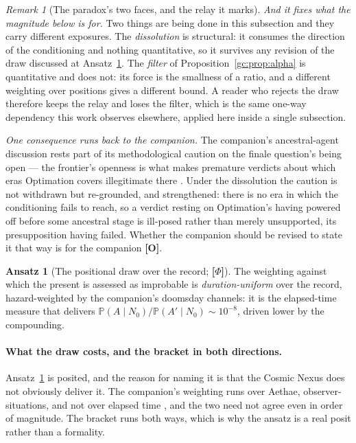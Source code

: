 \documentclass[11pt]{article}
\numberwithin{equation}{section}
\theoremstyle{plain}
\theoremstyle{definition}
\newtheorem{ansatz}[theorem]{Ansatz}
\theoremstyle{remark}
\newtheorem{remark}[theorem]{Remark}
\newcommand{\PP}{\mathbb{P}}
\begin{document}
\begin{remark}[The paradox's two faces, and the relay it marks]
\emph{And it fixes what the magnitude below is for.} Two things are
being done in this subsection and they carry different exposures. The
\emph{dissolution} is structural: it consumes the direction of the
conditioning and nothing quantitative, so it survives any revision of
the draw discussed at Ansatz~\ref{ra:ans:draw}. The \emph{filter} of
Proposition~\ref{gc:prop:alpha} is quantitative and does not: its force
is the smallness of a ratio, and a different weighting over positions
gives a different bound. A reader who rejects the draw therefore keeps
the relay and loses the filter, which is the same one-way dependency
this work observes elsewhere, applied here inside a single subsection.

\emph{One consequence runs back to the companion.} The companion's
ancestral-agent discussion rests part of its methodological caution on
the finale question's being open --- the frontier's openness is what
makes premature verdicts about which eras Optimation covers
illegitimate there \cite{Aethus}. Under the dissolution the caution is
not withdrawn but re-grounded, and strengthened: there is no era in
which the conditioning fails to reach, so a verdict resting on
Optimation's having powered off before some ancestral stage is
ill-posed rather than merely unsupported, its presupposition
having failed. Whether the
companion should be revised to state it that way is for the companion
\textbf{[O]}.
\end{remark}

\begin{ansatz}[The positional draw over the record; \textbf{[$\Phi$]}]
\label{ra:ans:draw}
The weighting against which the present is assessed as improbable is
\emph{duration-uniform} over the record, hazard-weighted by the
companion's doomsday channels: it is the elapsed-time measure that
delivers $\PP(A\mid N_0)/\PP(A'\mid N_0)\sim10^{-8}$, driven lower by
the compounding.
\end{ansatz}

\paragraph{What the draw costs, and the bracket in both directions.}\label{ra:rem:drawcost}
Ansatz~\ref{ra:ans:draw} is posited, and the reason for naming it is
that the Cosmic Nexus does not obviously deliver it. The companion's
weighting runs over Aethae, observer-situations, and not over
elapsed time \cite{Nexus, NexicFoundation}, and the two need not agree
even in order of magnitude. The bracket runs both ways, which is why
the ansatz is a real posit rather than a formality.
\end{document}
